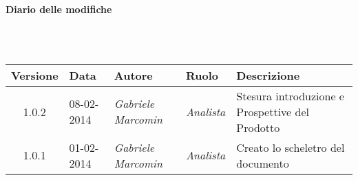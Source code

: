 \noindent\begin{Large}\textbf{Diario delle modifiche}\end{Large}\\
\\
\begin{small}
\begin{tabular}{|c|p{1.8cm}|p{2.8cm}|p{2.8cm}|p{3.5cm}|}
\hline
Versione & Data & Autore & Ruolo & Descrizione \\
\hline
\hline
1.0.2 & 08-02-2014 & 
\textit{Gabriele Marcomin} &
\textit{Analista} &  Stesura introduzione e Prospettive del Prodotto\\
\hline
\hline
1.0.1 & 01-02-2014 &
\textit{Gabriele Marcomin} &
\textit{Analista} &  Creato lo scheletro del documento\\
\end{tabular}\\
\end{small}